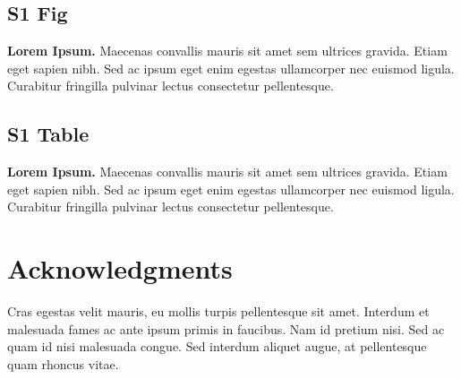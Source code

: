 \documentclass[10pt,letterpaper]{article}
\begin{document}
\subsection*{S1 Fig}
\label{S1_Fig}
{\bf Lorem Ipsum.} Maecenas convallis mauris sit amet sem ultrices gravida. Etiam eget sapien nibh. Sed ac ipsum eget enim egestas ullamcorper nec euismod ligula. Curabitur fringilla pulvinar lectus consectetur pellentesque.

\subsection*{S1 Table}
\label{S1_Table}
{\bf Lorem Ipsum.} Maecenas convallis mauris sit amet sem ultrices gravida. Etiam eget sapien nibh. Sed ac ipsum eget enim egestas ullamcorper nec euismod ligula. Curabitur fringilla pulvinar lectus consectetur pellentesque.

\section*{Acknowledgments}
Cras egestas velit mauris, eu mollis turpis pellentesque sit amet. Interdum et malesuada fames ac ante ipsum primis in faucibus. Nam id pretium nisi. Sed ac quam id nisi malesuada congue. Sed interdum aliquet augue, at pellentesque quam rhoncus vitae.

\nolinenumbers


{}
\end{document}
